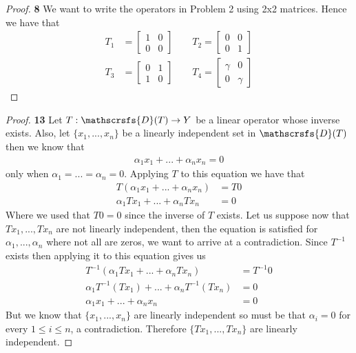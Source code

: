 \documentclass[11pt]{article}
\newcommand{\dom}{\mathscrsfs{D}}
\theoremstyle{definition}
\begin{document}
\begin{proof}{\textbf{8}}
    We want to write the operators in Problem 2 using 2x2 matrices. Hence
    we have that
    \begin{align*}
        T_1 &= \begin{bmatrix}
            1 & 0\\
            0 & 0
        \end{bmatrix}\qquad
        T_2 = \begin{bmatrix}
            0 & 0\\
            0 & 1
        \end{bmatrix}\\
        T_3 &= \begin{bmatrix}
            0 & 1\\
            1 & 0
        \end{bmatrix}\qquad
        T_4 = \begin{bmatrix}
            \gamma & 0\\
            0 & \gamma
        \end{bmatrix}
    \end{align*}
\end{proof}
\begin{proof}{\textbf{13}}
    Let $T:\dom(T) \to Y$ be a linear operator whose inverse exists.
    Also, let $\{x_1, ..., x_n\}$ be a linearly independent set in $\dom(T)$
    then we know that
    \begin{align*}
        \alpha_1 x_1 + ... + \alpha_n x_n = 0
    \end{align*}
    only when $\alpha_1 = ... = \alpha_n = 0$. Applying $T$ to this equation
    we have that
    \begin{align*}
        T(\alpha_1 x_1 + ... + \alpha_n x_n) &= T0\\
        \alpha_1 Tx_1 + ... + \alpha_n Tx_n &= 0
    \end{align*}
    Where we used that $T0 = 0$ since the inverse of $T$ exists.
    Let us suppose now that $Tx_1, ..., Tx_n$ are not linearly independent,
    then the equation is satisfied for $\alpha_1, ..., \alpha_n$ where not
    all are zeros, we want to arrive at a contradiction.
    Since $T^{-1}$ exists then applying it to this equation gives us
    \begin{align*}
        T^{-1}(\alpha_1Tx_1 + ... + \alpha_n Tx_n) &= T^{-1}0\\
        \alpha_1T^{-1}(Tx_1) + ... + \alpha_n T^{-1}(Tx_n) &= 0\\
        \alpha_1 x_1 + ... + \alpha_n x_n &= 0
    \end{align*}
    But we know that $\{x_1, ..., x_n\}$ are linearly independent so must be
    that $\alpha_i = 0$ for every $1 \leq i \leq n$, a contradiction.
    Therefore $\{Tx_1, ..., Tx_n\}$ are linearly independent.
\end{proof}
\end{document}
